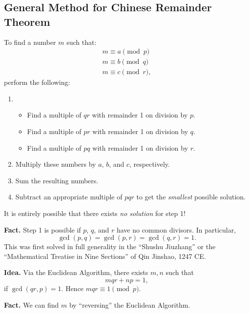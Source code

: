 \documentclass[class=article, crop=false]{standalone}
\begin{document}
  \subsection{General Method for Chinese Remainder Theorem}
  To find a number $m$ such that:
  \begin{align*}
    m\equiv a\pmod p \\
    m\equiv b\pmod q \\
    m\equiv c\pmod r,
  \end{align*}
  perform the following:
  \begin{enumerate}[label=(\arabic*)]
    \item 
    \begin{itemize}
      \item Find a multiple of $qr$ with remainder 1 on division by $p$.
      \item Find a multiple of $pr$ with remainder 1 on division by $q$.
      \item Find a multiple of $pq$ with remainder 1 on division by $r$.
    \end{itemize}
    \item Multiply these numbers by $a$, $b$, and $c$, respectively.
    \item Sum the resulting numbers.
    \item Subtract an appropriate multiple of $pqr$ to get the \emph{smallest} possible solution.
  \end{enumerate}
  \begin{note}{}
    It is entirely possible that there exists \emph{no solution} for step 1!
  \end{note}
  \textbf{Fact.} Step 1 is possible if $p$, $q$, and $r$ have no common divisors. In particular,
  \[
    \gcd(p, q) = \gcd(p, r) = \gcd(q, r) = 1.
  \]
  This was first solved in full generality in the ``Shushu Jiuzhang'' or the ``Mathematical Treatise in Nine Sections'' of Qin Jinshao, 1247 CE. \par
  \textbf{Idea.} Via the Euclidean Algorithm, there exists $m, n$ such that
  \[
    mqr + np = 1,
  \]
  if $\gcd(qr, p) = 1$. Hence $mqr\equiv 1\pmod p$. \par
  \textbf{Fact.} We can find $m$ by ``reversing'' the Euclidean Algorithm.
\end{document}
